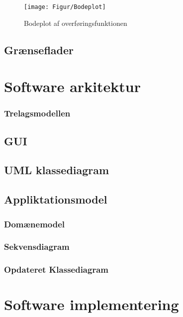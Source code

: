 \begin{figure}[h]
	\centering
	\texttt{[image: Figur/Bodeplot]}
	\caption[]{Bodeplot af overføringsfunktionen\footnotemark}
	\label{fig:Bodeplot}
\end{figure}


\subsection{Grænseflader}

\section{Software arkitektur}


\subsubsection{Trelagsmodellen}

\subsection{GUI}

\subsection{UML klassediagram}


\subsection{Appliktationsmodel}
 

\subsubsection{Domænemodel}

\subsubsection{Sekvensdiagram}

\subsubsection{Opdateret Klassediagram}

\section{Software implementering}
 
